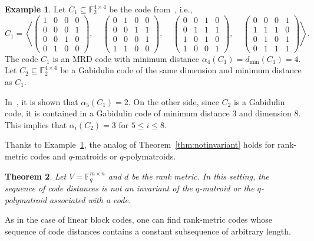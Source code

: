 \documentclass[12pt]{amsart}
\numberwithin{equation}{section}
\newtheorem{theorem}{Theorem}[section]
\theoremstyle{definition}
\newtheorem{example}[theorem]{Example}
\newcommand{\FF}{\mathbb{F}}
\begin{document}
\begin{example}\label{ex:unequivMRD}
Let $C_1\subseteq\FF_2^{4\times 4}$ be the code from~\cite[Example~7.2]{BR17}, i.e.,
$$C_1=\left\langle\begin{pmatrix}
   1 & 0 & 0 & 0 \\ 0 & 0 & 0 & 1 \\ 0 & 0 & 1 & 0 \\ 0 & 1 & 0 & 0
  \end{pmatrix}, \ \ \ \ \ 
\begin{pmatrix}
   0 & 1 & 0 & 0 \\ 0 & 0 & 1 & 1 \\ 0 & 0 & 0 & 1 \\ 1 & 1 & 0 & 0
  \end{pmatrix},  \ \ \ \ \ 
\begin{pmatrix}
   0 & 0 & 1 & 0 \\ 0 & 1 & 1 & 1 \\ 1 & 0 & 1 & 0 \\ 1 & 0 & 0 & 1
  \end{pmatrix},\ \ \ \ \ 
\begin{pmatrix}
   0 & 0 & 0 & 1 \\ 1 & 1 & 1 & 0 \\ 0 & 1 & 0 & 1 \\ 0 & 1 & 1 & 1
  \end{pmatrix}\right\rangle.
$$  
The code $C_1$ is an MRD code with minimum distance $\alpha_4(C_1)=d_{\min}(C_1)=4$. 
Let $C_2\subseteq\FF_2^{4\times 4}$ be a Gabidulin code of the same dimension and minimum distance as $C_1$.

In~\cite[Example 7.2]{BR17}, it is shown that
$\alpha_5(C_1)=2$. On the other side, since $C_2$ is a Gabidulin code, it is contained in a Gabidulin code of minimum distance $3$ and dimension $8$. This implies that $\alpha_i(C_2)=3$ for $5\leq i\leq 8$.
\end{example}

Thanks to Example~\ref{ex:unequivMRD}, the analog of Theorem~\ref{thm:notinvariant} holds for rank-metric codes and $q$-matroids or $q$-polymatroids.

\begin{theorem}\label{thm:polymatroid}
Let $V=\mathbb{F}_q^{m\times n}$ and $d$ be the rank metric. In this setting, the sequence of code distances is not an invariant of the $q$-matroid or the $q$-polymatroid associated with a code.
\end{theorem}

As in the case of linear block codes, one can find rank-metric codes whose sequence of code distances contains a constant subsequence of arbitrary length.
\end{document}
